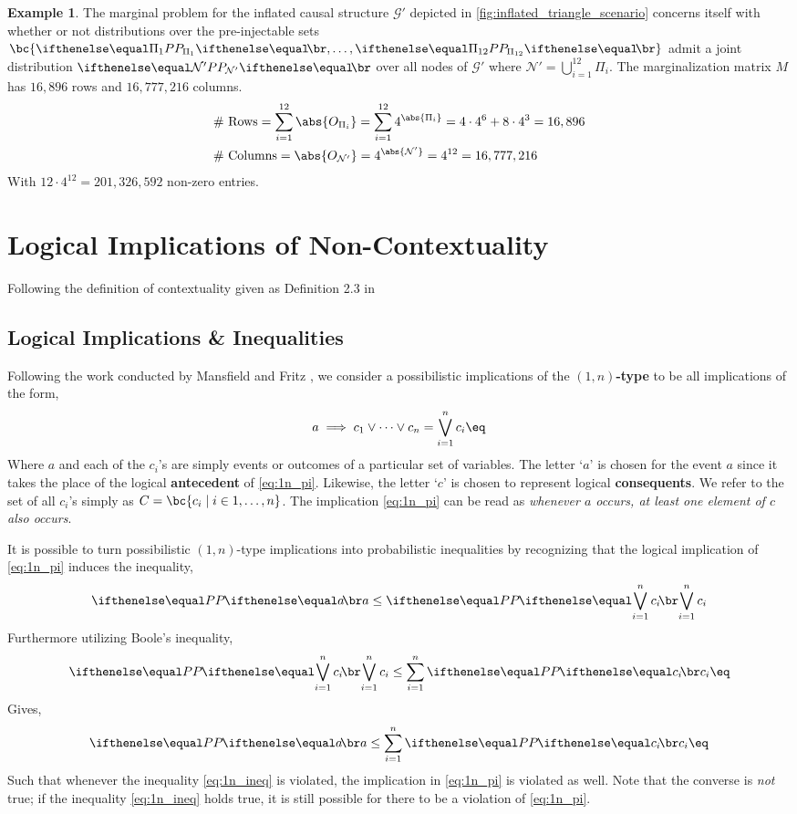 \documentclass[aps, 10pt, english, twoside, pra, nofootinbib, longbibliography]{revtex4-1}
\theoremstyle{plain}
\theoremstyle{definition}
\newtheorem{example}[theorem]{Example}
\theoremstyle{remark}
\newcommand{\graph}{\mathcal{G}}
\newcommand{\nodes}{\mathcal{N}}
\newcommand{\term}[1]{\textcolor{Mahogany}{\textbf{#1}}}
\begin{document}
    \begin{example}
        The marginal problem for the inflated causal structure $\graph'$ depicted in \cref{fig:inflated_triangle_scenario} concerns itself with whether or not distributions over the pre-injectable sets $\bc{\prob[\Pi_1], \ldots, \prob[\Pi_{12}]}$ admit a joint distribution $\prob[\mathcal{\nodes'}]$ over all nodes of $\graph'$ where $\nodes' = \bigcup_{i=1}^{12}\Pi_i$. The marginalization matrix $M$ has $16,896$ rows and $16,777,216$ columns.
        \begin{align*}
            &\text{\# Rows} = \sum_{i=1}^{12} \abs{O_{\Pi_i}} = \sum_{i=1}^{12} 4^{\abs{\Pi_i}} = 4 \cdot 4^6 + 8 \cdot 4^3 = 16,896 \\
            &\text{\# Columns} = \abs{O_{\nodes'}} = 4^{\abs{\nodes'}} = 4^{12} = 16,777,216
        \end{align*}
        With $12 \cdot 4^{12} = 201,326,592$ non-zero entries.
    \end{example}


    \section{Logical Implications of Non-Contextuality}
    Following the definition of contextuality given as Definition 2.3 in \cite{Fritz_2011}
    \subsection{Logical Implications \& Inequalities}
    Following the work conducted by Mansfield and Fritz \cite{Mansfield_2012}, we consider a possibilistic implications of the \term{$(1,n)$-type} to be all implications of the form,
    \[ a \implies c_1 \lor \cdots \lor c_n = \bigvee_{i=1}^{n} c_i \eq \label{eq:1n_pi}\]
    Where $a$ and each of the $c_i$'s are simply events or outcomes of a particular set of variables. The letter `$a$' is chosen for the event $a$ since it takes the place of the logical \term{antecedent} of \cref{eq:1n_pi}. Likewise, the letter `$c$' is chosen to represent logical \term{consequents}. We refer to the set of all $c_i$'s simply as $C = \bc{c_i \mid i \in 1, \ldots, n}$. The implication \cref{eq:1n_pi} can be read as \textit{whenever $a$ occurs, at least one element of $c$ also occurs}.

    It is possible to turn possibilistic $(1,n)$-type implications into probabilistic inequalities by recognizing that the logical implication of \cref{eq:1n_pi} induces the inequality,
    \[ \prob[][a] \leq \prob[][\bigvee_{i=1}^{n} c_i] \]
    Furthermore utilizing Boole's inequality,
    \[ \prob[][\bigvee_{i=1}^{n} c_i] \leq \sum_{i=1}^{n} \prob[][c_i] \eq \label{eq:booles} \]
    Gives,
    \[ \prob[][a] \leq \sum_{i=1}^{n} \prob[][c_i] \eq \label{eq:1n_ineq} \]
    Such that whenever the inequality \cref{eq:1n_ineq} is violated, the implication in \cref{eq:1n_pi} is violated as well. Note that the converse is \textit{not} true; if the inequality \cref{eq:1n_ineq} holds true, it is still possible for there to be a violation of \cref{eq:1n_pi}.
\end{document}
